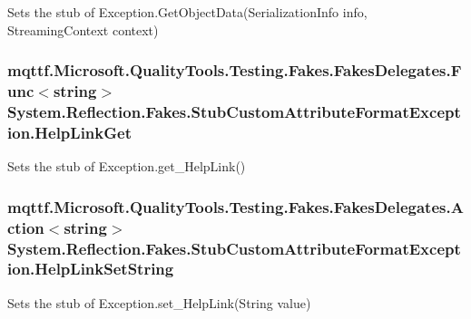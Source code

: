 Sets the stub of Exception.\-Get\-Object\-Data(\-Serialization\-Info info, Streaming\-Context context)

\hypertarget{class_system_1_1_reflection_1_1_fakes_1_1_stub_custom_attribute_format_exception_ad91976a7c3318e490aa5082b020219d7}{
\subsubsection[{Help\-Link\-Get}]{\setlength{\rightskip}{0pt plus 5cm}mqttf.\-Microsoft.\-Quality\-Tools.\-Testing.\-Fakes.\-Fakes\-Delegates.\-Func$<$string$>$ System.\-Reflection.\-Fakes.\-Stub\-Custom\-Attribute\-Format\-Exception.\-Help\-Link\-Get}}\label{class_system_1_1_reflection_1_1_fakes_1_1_stub_custom_attribute_format_exception_ad91976a7c3318e490aa5082b020219d7}


Sets the stub of Exception.\-get\-\_\-\-Help\-Link()

\hypertarget{class_system_1_1_reflection_1_1_fakes_1_1_stub_custom_attribute_format_exception_aa9857ac7501b38aed60321e7732bec24}{
\subsubsection[{Help\-Link\-Set\-String}]{\setlength{\rightskip}{0pt plus 5cm}mqttf.\-Microsoft.\-Quality\-Tools.\-Testing.\-Fakes.\-Fakes\-Delegates.\-Action$<$string$>$ System.\-Reflection.\-Fakes.\-Stub\-Custom\-Attribute\-Format\-Exception.\-Help\-Link\-Set\-String}}\label{class_system_1_1_reflection_1_1_fakes_1_1_stub_custom_attribute_format_exception_aa9857ac7501b38aed60321e7732bec24}


Sets the stub of Exception.\-set\-\_\-\-Help\-Link(\-String value)

